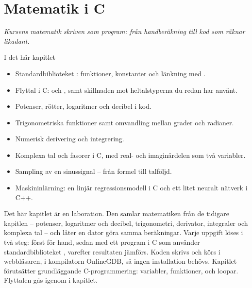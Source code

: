 
\chapter{Matematik i C}
\label{c18:ch}

{\large\itshape Kursens matematik skriven som program: från handberäkning till kod som räknar
likadant.\par}

\begin{chapterbox}{I det här kapitlet}
\begin{itemize}
  \item Standardbiblioteket : funktioner, konstanter och länkning med .
  \item Flyttal i C:  och , samt skillnaden mot heltalstyperna du redan
    har använt.
  \item Potenser, rötter, logaritmer och decibel i kod.
  \item Trigonometriska funktioner samt omvandling mellan grader och radianer.
  \item Numerisk derivering och integrering.
  \item Komplexa tal och fasorer i C, med real- och imaginärdelen som två variabler.
  \item Sampling av en sinussignal -- från formel till talföljd.
  \item Maskininlärning: en linjär regressionsmodell i C och ett litet neuralt nätverk i C++.
\end{itemize}
\end{chapterbox}

Det här kapitlet är en laboration. Den samlar matematiken från de tidigare kapitlen -- potenser,
logaritmer och decibel, trigonometri, derivator, integraler och komplexa tal -- och låter en dator
göra samma beräkningar. Varje uppgift löses i två steg: först för hand, sedan med ett program i C
som använder standardbiblioteket , varefter resultaten jämförs.
Koden skrivs och körs i webbläsaren, i kompilatorn OnlineGDB, så ingen installation behövs.
Kapitlet förutsätter grundläggande C-programmering: variabler, funktioner,  och
loopar. Flyttalen gås igenom i kapitlet.

